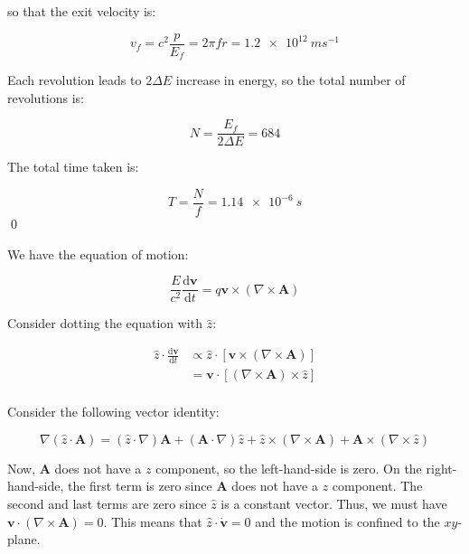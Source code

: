 \documentclass[12pt]{article}
\begin{document}
so that the exit velocity is:

\begin{equation}
    v_{f} = c^{2}\frac{p}{E_{f}} = 2\pi f r = \qty{1.2e12}{ms^{-1}}
\end{equation}

Each revolution leads to $2\Delta E$ increase in energy, so the total number of revolutions is:

\begin{equation}
    N = \frac{E_{f}}{2\Delta E} = 684
\end{equation}

The total time taken is:

\begin{equation}
    T = \frac{N}{f} = \qty{1.14e-6}{s}
\end{equation}
\qed



We have the equation of motion:

\begin{equation}
    \frac{E}{c^{2}} \frac{\mathrm{d}\mathbf{v}}{\mathrm{d}t} = q \mathbf{v} \times (\nabla \times \mathbf{A})
\end{equation}

Consider dotting the equation with $\hat{z}$:

\begin{equation}
    \begin{split}
        \hat{z} \cdot \frac{\mathrm{d}\mathbf{v}}{\mathrm{d}t} &\propto \hat{z} \cdot [\mathbf{v} \times (\nabla \times \mathbf{A})] \\
        &= \mathbf{v} \cdot [(\nabla \times \mathbf{A}) \times \hat{z}] \\
    \end{split}
\end{equation}

Consider the following vector identity:

\begin{equation}
    \nabla (\hat{z} \cdot \mathbf{A}) = (\hat{z} \cdot \nabla) \mathbf{A} + (\mathbf{A} \cdot \nabla) \hat{z} + \hat{z} \times (\nabla \times \mathbf{A}) + \mathbf{A} \times (\nabla \times \hat{z})
\end{equation}

Now, $\mathbf{A}$ does not have a $z$ component, so the left-hand-side is zero. On the right-hand-side, the first term is zero since $\mathbf{A}$ does not have a $z$ component. The second and last terms are zero since $\hat{z}$ is a constant vector. Thus, we must have $\mathbf{v} \cdot (\nabla \times \mathbf{A}) = 0$. This means that $\hat{z} \cdot \dot{\mathbf{v}} = 0$ and the motion is confined to the $xy$-plane.
\end{document}
